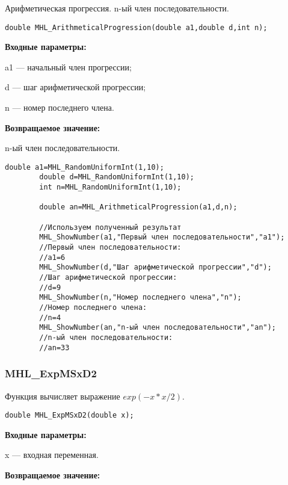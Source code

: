\documentclass[a4paper,12pt]{article}
\begin{document}
Арифметическая прогрессия. n-ый член последовательности.


\begin{lstlisting}[label=code_syntax_MHL_ArithmeticalProgression,caption=Синтаксис]
double MHL_ArithmeticalProgression(double a1,double d,int n);
\end{lstlisting}

\textbf{Входные параметры:}  
 
a1 --- начальный член прогрессии;
 
d --- шаг арифметической прогрессии;
 
n --- номер последнего члена.

\textbf{Возвращаемое значение:}
 
n-ый член последовательности.


\begin{lstlisting}[label=code_use_MHL_ArithmeticalProgression,caption=Пример использования]
        double a1=MHL_RandomUniformInt(1,10);
        double d=MHL_RandomUniformInt(1,10);
        int n=MHL_RandomUniformInt(1,10);

        double an=MHL_ArithmeticalProgression(a1,d,n);

        //Используем полученный результат
        MHL_ShowNumber(a1,"Первый член последовательности","a1");
        //Первый член последовательности:
        //a1=6
        MHL_ShowNumber(d,"Шаг арифметической прогрессии","d");
        //Шаг арифметической прогрессии:
        //d=9
        MHL_ShowNumber(n,"Номер последнего члена","n");
        //Номер последнего члена:
        //n=4
        MHL_ShowNumber(an,"n-ый член последовательности","an");
        //n-ый член последовательности:
        //an=33
\end{lstlisting}

\subsubsection{MHL\_ExpMSxD2}\label{MHL_ExpMSxD2}

Функция вычисляет выражение $exp(-x*x/2)$.


\begin{lstlisting}[label=code_syntax_MHL_ExpMSxD2,caption=Синтаксис]
double MHL_ExpMSxD2(double x);
\end{lstlisting}

\textbf{Входные параметры:}

 x --- входная переменная.

\textbf{Возвращаемое значение:}
 
\end{document}
